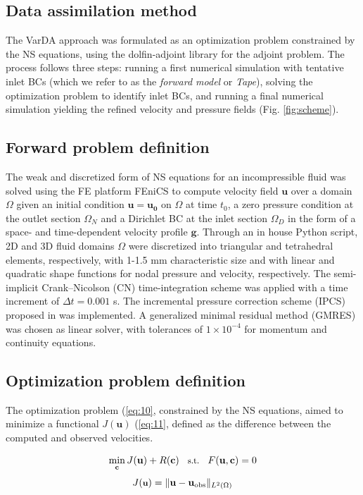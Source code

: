 \subsection*{Data assimilation method}
The VarDA approach was formulated as an optimization problem constrained by the NS equations, using the dolfin-adjoint library for the adjoint problem. The process follows three steps: running a first numerical simulation with tentative inlet BCs (which we refer to as the \emph{forward model} or \emph{Tape}), solving the optimization problem to identify inlet BCs, and running a final numerical simulation yielding the refined velocity and pressure fields (Fig. \ref{fig:scheme}).

\subsection*{Forward problem definition}
The weak and discretized form of NS equations for an incompressible fluid \citep{Stokes2009} was solved using the FE platform FEniCS \citep{Alnaes2015} to compute velocity field $\textbf{u}$ over a domain $\Omega$ given an initial condition \(\mathbf{u}=\mathbf{u_0}\) on $\Omega$ at time $t_0$, a zero pressure condition at the outlet section $\Omega_N$ and a Dirichlet BC at the inlet section $\Omega_D$ in the form of a space- and time-dependent velocity profile $\textbf{g}$. Through an in house Python script, 2D and 3D fluid domains $\Omega$ were discretized into triangular and tetrahedral elements, respectively, with 1-1.5 mm characteristic size and with linear and quadratic shape functions for nodal pressure and velocity, respectively. The semi-implicit Crank--Nicolson (CN) time-integration scheme was applied with a time increment of $\Delta t = 0.001$ s. The incremental pressure correction scheme (IPCS) proposed in \citep{Goda1979} was implemented. A generalized minimal residual method (GMRES) was chosen as linear solver, with tolerances of $1 \times 10^{-4}$ for momentum and continuity equations.

\subsection*{Optimization problem definition}

The optimization problem (\cref{eq:10}, constrained by the NS equations, aimed to minimize a functional $J(\mathbf{u})$ (\cref{eq:11}, defined as the difference between the computed and observed velocities. 

\begin{equation}
\small
\min_{\mathbf{c}} J(\mathbf{u}) + R(\mathbf{c}) \quad \text{s.t.} \quad F(\mathbf{u}, \mathbf{c}) = 0
\label{eq:10}
\end{equation}
\begin{equation}
\small
    J(\textbf{u}) = \| \mathbf{u} - \mathbf{u}_{\text{obs}} \|_{L^2(\Omega)}
    \label{eq:11}
\end{equation}

